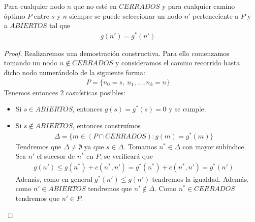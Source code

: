 \begin{lema}\label{lema:admisible_1}
    Para cualquier nodo $n$ que no esté en $CERRADOS$ y para cualquier camino óptimo $P$ entre $s$ y $n$ siempre se puede seleccionar un nodo $n'$ perteneciente a $P$ y a $ABIERTOS$ tal que 
    \begin{gather*}
        g(n') = g^*(n')
    \end{gather*}

    \begin{proof}
        Realizaremos una demostración constructiva. Para ello comenzamos tomando un nodo $n\notin CERRADOS$ y consideramos el camino recorrido hasta dicho nodo numerándolo de la siguiente forma:
        \begin{gather*}
            P = \{n_0=s,\ n_1,..., n_k = n\}
        \end{gather*}
        Tenemos entonces 2 casuísticas posibles: 
        \begin{itemize}
            \item Si $s\in ABIERTOS$, entonces $g(s) = g^*(s) = 0$ y se cumple.
            \item Si $s\notin ABIERTOS$, entonces construímos
            \begin{gather*}
                \Delta = \{m\in (P\cap CERRADOS) : g(m) = g^*(m)\}
            \end{gather*}
            Tendremos que $\Delta \neq \emptyset$ ya que $s\in \Delta$. Tomamos $n^*\in \Delta$ con mayor subíndice. Sea $n'$ el sucesor de $n^*$ en $P$, se verificará que 
            \begin{gather*}
                g(n') \leq g(n^*) +c(n^*, n') = g^*(n^*) +c(n^*, n') = g^*(n')
            \end{gather*}
            Además, como en general $g^*(n') \leq g(n')$ tendremos la igualdad. Además, como $n'\in ABIERTOS$ tendremos que $n'\notin \Delta$. Como $n^*\in CERRADOS$ tendremos que $n'\in P$.
        \end{itemize}
    \end{proof}
\end{lema}

